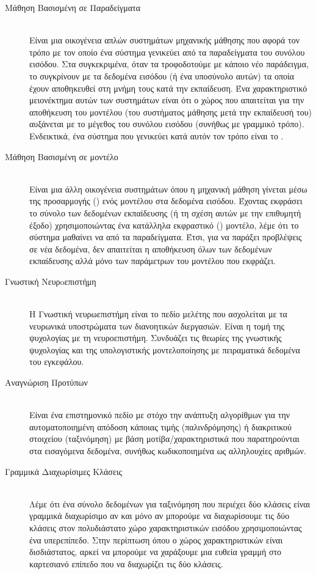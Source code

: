 \begin{description}
    \item[Μάθηση Βασισμένη σε Παραδείγματα] \hfill \\ Είναι μια οικογένεια απλών συστημάτων μηχανικής μάθησης που αφορά τον τρόπο με τον οποίο ένα σύστημα γενικεύει από τα παραδείγματα του συνόλου εισόδου. Στα συγκεκριμένα, όταν τα τροφοδοτούμε με κάποιο νέο παράδειγμα, το συγκρίνουν με τα δεδομένα εισόδου (ή ένα υποσύνολο αυτών) τα οποία έχουν αποθηκευθεί στη μνήμη τους κατά την εκπαίδευση. Ένα χαρακτηριστικό μειονέκτημα αυτών των συστημάτων είναι ότι ο χώρος που απαιτείται για την αποθήκευση του μοντέλου (του συστήματος μάθησης μετά την εκπαίδευσή του) αυξάνεται με το μέγεθος του συνόλου εισόδου (συνήθως με γραμμικό τρόπο). Ενδεικτικά, ένα σύστημα που γενικεύει κατά αυτόν τον τρόπο είναι το .
    
    \item[Μάθηση Βασισμένη σε μοντέλο] \hfill \\ Είναι μια άλλη οικογένεια συστημάτων όπου η μηχανική μάθηση γίνεται μέσω της προσαρμογής () ενός μοντέλου στα δεδομένα εισόδου. Έχοντας εκφράσει το σύνολο των δεδομένων εκπαίδευσης (ή τη σχέση αυτών με την επιθυμητή έξοδο) χρησιμοποιώντας ένα κατάλληλα εκφραστικό () μοντέλο, λέμε ότι το σύστημα μαθαίνει να  από τα παραδείγματα. Έτσι, για να παράξει προβλέψεις σε νέα δεδομένα, δεν απαιτείται η αποθήκευση όλων των δεδομένων εκπαίδευσης αλλά μόνο των παράμετρων του μοντέλου που εκφράζει.

    \item[Γνωστική Νευρoεπιστήμη] \hfill \\ Η Γνωστική νευρωεπιστήμη είναι το πεδίο μελέτης που ασχολείται με τα νευρωνικά υποστρώματα των διανοητικών διεργασιών. Είναι η τομή της ψυχολογίας με τη νευροεπιστήμη. Συνδυάζει τις θεωρίες της γνωστικής ψυχολογίας και της υπολογιστικής μοντελοποίησης με πειραματικά δεδομένα του εγκεφάλου.
    
    \item[Αναγνώριση Προτύπων] \hfill \\ Είναι ένα επιστημονικό πεδίο με στόχο την ανάπτυξη αλγορίθμων για την αυτοματοποιημένη απόδοση κάποιας τιμής (παλινδρόμησης) ή διακριτικού στοιχείου (ταξινόμηση) με βάση μοτίβα/χαρακτηριστικά που παρατηρούνται στα εισαγόμενα δεδομένα, συνήθως κωδικοποιημένα ως αλληλουχίες αριθμών.  
    \item[Γραμμικά Διαχωρίσιμες Κλάσεις] \hfill \\ Λέμε ότι ένα σύνολο δεδομένων για ταξινόμηση που περιέχει δύο κλάσεις είναι γραμμικά διαχωρίσιμο αν και μόνο αν μπορούμε να διαχωρίσουμε τις δύο κλάσεις στον πολυδιάστατο χώρο χαρακτηριστικών εισόδου χρησιμοποιώντας ένα υπερεπίπεδο. Στην περίπτωση όπου ο χώρος χαρακτηριστικών είναι δισδιάστατος, αρκεί να μπορούμε να χαράξουμε μια ευθεία γραμμή στο καρτεσιανό επίπεδο που να διαχωρίζει τις δύο κλάσεις.
    

\end{description}
